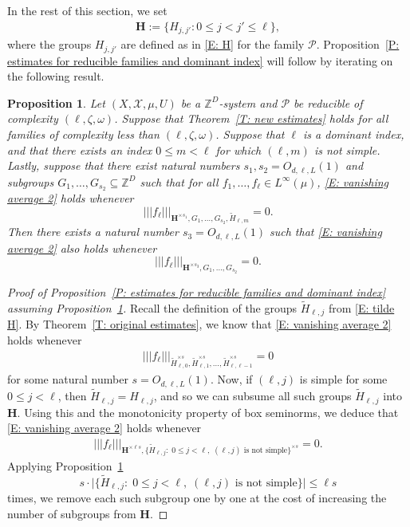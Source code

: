 \documentclass[11pt]{amsart}
\newtheorem{proposition}[lemma]{Proposition}
\theoremstyle{definition}
\newcommand{\Z}{{\mathbb Z}}
\newcommand{\CP}{{\mathcal P}}
\newcommand{\CX}{{\mathcal X}}
\newcommand{\nnorm}[1]{\lvert\!|\!| #1|\!|\!\rvert}
\newcommand{\1}{{\mathbf{1}}}
\newcommand{\bigabs}[1]{\bigl| #1 \bigr|}
\newcommand{\srem}[1]{ \{ #1 \}}
\begin{document}
In the rest of this section, we set
\begin{align}\label{E: bolded G}
    \mathbf{H}:=\{H_{j,j'}\colon 0\leq j<j'\leq \ell\},
\end{align}
where the groups $H_{j,j'}$ are defined as in \eqref{E: H} for the family $\CP$. Proposition~\ref{P: estimates for reducible families and dominant index} will follow by iterating on the following result.
\begin{proposition}\label{P: smoothing}
    Let $(X, \CX, \mu, U)$ be a $\Z^D$-system and $\CP$ be reducible of complexity $(\ell, \zeta, \omega)$. Suppose that Theorem~\ref{T: new estimates} holds for all families of complexity less than $(\ell, \zeta, \omega)$. Suppose that $\ell$ is a dominant index, and that there exists an index $0\leq m < \ell$  for which {$(\ell,m)$ is not simple}. Lastly, suppose that there exist natural numbers $s_1, s_2=O_{d,\ell,L}(1)$ and subgroups $G_1, \ldots, G_{s_2}\subseteq \Z^D$ such that for all  $f_1, \ldots, f_\ell\in L^\infty(\mu)$, \eqref{E: vanishing average 2} holds whenever $$\nnorm{f_\ell}_{\mathbf{H}^{\times s_1}, G_1, \ldots, G_{s_2}, \tilde H_{\ell,m}} = 0.$$
    Then there exists a natural number $s_3=O_{d,\ell,L}(1)$ such that \eqref{E: vanishing average 2} also holds whenever
    $$\nnorm{f_\ell}_{\mathbf{H}^{\times s_3}, G_1, \ldots, G_{s_2}} = 0.$$
\end{proposition}
\begin{proof}[Proof of Proposition~\ref{P: estimates for reducible families and dominant index} assuming Proposition~\ref{P: smoothing}]
    Recall the definition of the groups $\tilde H_{\ell,j}$ from \eqref{E: tilde H}.
    By Theorem~\ref{T: original estimates}, we know that \eqref{E: vanishing average 2} holds whenever
    \begin{align*}
        \nnorm{f_\ell}_{\tilde H_{\ell,0}^{\times s}, \tilde H_{\ell, 1}^{\times s}, \ldots, \tilde H_{\ell, \ell-1}^{\times s}} = 0
    \end{align*}
    for some natural number $s=O_{d,\ell,L}(1)$. Now, if $(\ell,j)$ is simple for some $0\leq j<\ell$, then $\tilde H_{\ell, j} = H_{\ell,j}$, and so we can subsume all such groups $\tilde H_{\ell, j}$ into $\mathbf{H}$. Using this and the monotonicity property of box seminorms, we deduce that \eqref{E: vanishing average 2} holds whenever
    \begin{align*}
        \nnorm{f_\ell}_{\mathbf{H}^{\times \ell s}, \{\tilde H_{\ell, j}\colon\; 0\leq j <\ell,\; \text{$(\ell,j)$ is not simple}\}^{\times s}} = 0.
    \end{align*}
    Applying Proposition~\ref{P: smoothing} $$s\cdot \bigabs{\srem{\tilde H_{\ell, j}\colon\; 0\leq j <\ell,\; \text{$(\ell,j)$ is not simple}}}\leq \ell s$$ times, we remove each such subgroup one by one at the cost of increasing the number of subgroups from $\mathbf{H}$. 
\end{proof}
\end{document}
